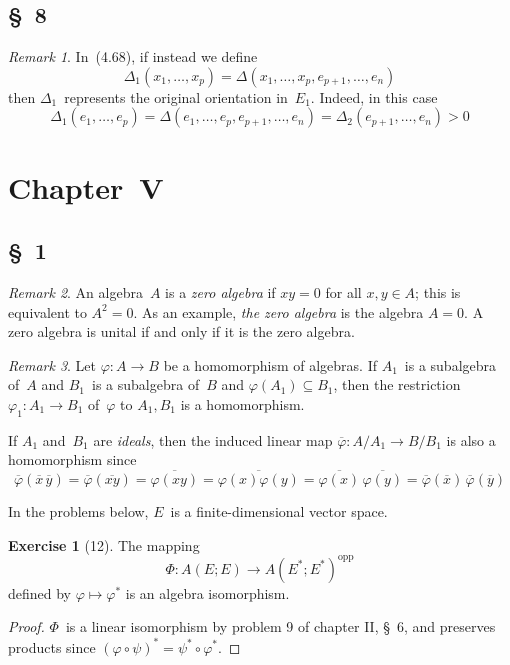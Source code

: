 \documentclass[letterpaper,12pt]{article}
\newcommand{\after}{\circ}
\newcommand{\opp}[1]{#1^{\mathrm{opp}}}
\newcommand{\proj}[1]{\overline{#1}}
\theoremstyle{definition}
\newtheorem*{exer}{Exercise}
\theoremstyle{remark}
\newtheorem*{rmk}{Remark}
\begin{document}
\subsection*{\S~8}
\begin{rmk}
In~(4.68), if instead we define
\[\Delta_1(x_1,\ldots,x_p)=\Delta(x_1,\ldots,x_p,e_{p+1},\ldots,e_n)\]
then \(\Delta_1\)~represents the original orientation in~\(E_1\). Indeed, in this case
\[\Delta_1(e_1,\ldots,e_p)=\Delta(e_1,\ldots,e_p,e_{p+1},\ldots,e_n)=\Delta_2(e_{p+1},\ldots,e_n)>0\]
\end{rmk}

\section*{Chapter~V}
\subsection*{\S~1}
\begin{rmk}
An algebra~\(A\) is a \emph{zero algebra} if \(xy=0\) for all \(x,y\in A\); this is equivalent to \(A^2=0\). As an example, \emph{the zero algebra} is the algebra \(A=0\). A zero algebra is unital if and only if it is the zero algebra.
\end{rmk}

\begin{rmk}
Let \(\varphi:A\to B\) be a homomorphism of algebras. If \(A_1\)~is a subalgebra of~\(A\) and \(B_1\)~is a subalgebra of~\(B\) and \(\varphi(A_1)\subseteq B_1\), then the restriction \(\varphi_1:A_1\to B_1\) of~\(\varphi\) to \(A_1,B_1\) is a homomorphism.

If \(A_1\) and~\(B_1\) are \emph{ideals}, then the induced linear map \(\proj{\varphi}:A/A_1\to B/B_1\) is also a homomorphism since
\[\proj{\varphi}(\proj{x}\,\proj{y})=\proj{\varphi}(\proj{xy})=\proj{\varphi(xy)}=\proj{\varphi(x)\varphi(y)}=\proj{\varphi(x)}\,\proj{\varphi(y)}=\proj{\varphi}(\proj{x})\,\proj{\varphi}(\proj{y})\]
\end{rmk}

\noindent In the problems below, \(E\)~is a finite-dimensional vector space.
\begin{exer}[12]
The mapping
\[\Phi:A(E;E)\to\opp{A(E^*;E^*)}\]
defined by \(\varphi\mapsto\varphi^*\) is an algebra isomorphism.
\end{exer}
\begin{proof}
\(\Phi\)~is a linear isomorphism by problem 9 of chapter II, \S~6, and preserves products since \((\varphi\after\psi)^*=\psi^*\after\varphi^*\).
\end{proof}
\end{document}
